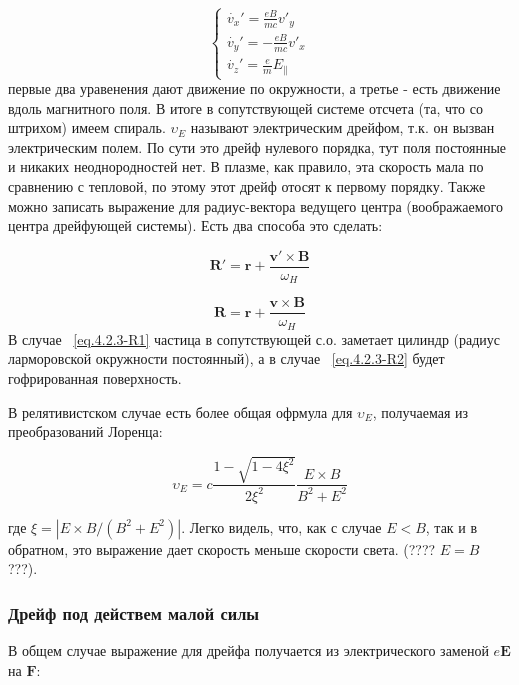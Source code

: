 \documentclass[10pt, a4paper]{article}
\numberwithin{equation}{section}
\begin{document}
\begin{equation}
    \begin{cases}
    \label{eq.4.2.2-motion}
    \dot{v_x}'=  \frac{eB}{mc} v'_y \\
    \dot{v_y}'= -\frac{eB}{mc} v'_x \\
    \dot{v_z}'=  \frac{e}{m} E_{\parallel}
    \end{cases}
\end{equation}
первые два уравенения дают движение по окружности, а третье - есть движение вдоль магнитного поля. В итоге в сопутствующей
системе отсчета (та, что со штрихом) имеем спираль. $\upsilon_E$ называют электрическим дрейфом, т.к. он вызван 
электрическим полем. По сути это дрейф нулевого порядка, тут поля постоянные и никаких неоднородностей нет. В плазме,
как правило, эта скорость мала по сравнению с тепловой, по этому этот дрейф отосят к первому порядку.
Также можно записать выражение для радиус-вектора ведущего центра (воображаемого центра дрейфующей системы). Есть два
способа это сделать:

\begin{equation}
    \label{eq.4.2.3-R1}
        \mathbf{R}'=\mathbf{r} + \frac{\mathbf{v}' \times \mathbf{B}}{\omega_H}
\end{equation}

\begin{equation}
    \label{eq.4.2.3-R2}
        \mathbf{R}=\mathbf{r} + \frac{\mathbf{v} \times \mathbf{B}}{\omega_H}
\end{equation}
В случае ~\ref{eq.4.2.3-R1} частица в сопутствующей с.о. заметает цилиндр (радиус ларморовской окружности постоянный), а
в случае ~\ref{eq.4.2.3-R2} будет гофрированная поверхность.

В релятивистском случае есть более общая офрмула для $\upsilon_E$, получаемая из преобразований Лоренца:

\begin{equation}
    \label{eq.4.2.4}
    \upsilon_E=c \frac{1-\sqrt{1-4\xi^2}}{2\xi^2} \frac{E \times B}{B^2 + E^2}
\end{equation}

где $\xi = |E\times B / (B^2 + E^2)|$. Легко видель, что, как с случае $E<B$, так и в обратном, это выражение дает 
скорость меньше скорости света. (???? $E=B$ ???).

\subsubsection{Дрейф под действем малой силы}
\label{sec.4.2.2}
В общем случае выражение для дрейфа получается из электрического заменой $e\mathbf{E}$ на $\mathbf{F}$:
\end{document}
